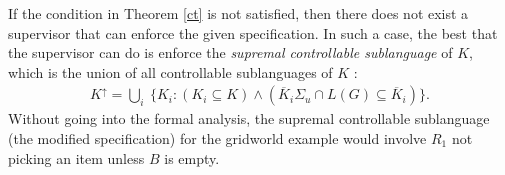 \documentclass[letterpaper, 10 pt, conference]{ieeeconf}
\newtheorem{theorem}{Theorem}
\begin{document}
If the condition in Theorem \ref{ct} is not satisfied, then there does not exist a supervisor that can enforce the given specification. In such a case, the best that the supervisor can do is enforce the \emph{supremal controllable sublanguage} of $K$, which is the union of all controllable sublanguages of $K$ \cite{wonham1987supremal}: 
\begin{align}\label{contr}
    K^{\uparrow} = \bigcup_i\ \{K_i: (K_i \subseteq K) \wedge (\overline{K}_i\Sigma_u \cap L(G) \subseteq \overline{K}_i)\}. \nonumber
\end{align}
Without going into the formal analysis, the supremal controllable sublanguage (the modified specification) for the gridworld example would involve $R_1$ not picking an item unless $B$ is empty.
\end{document}
